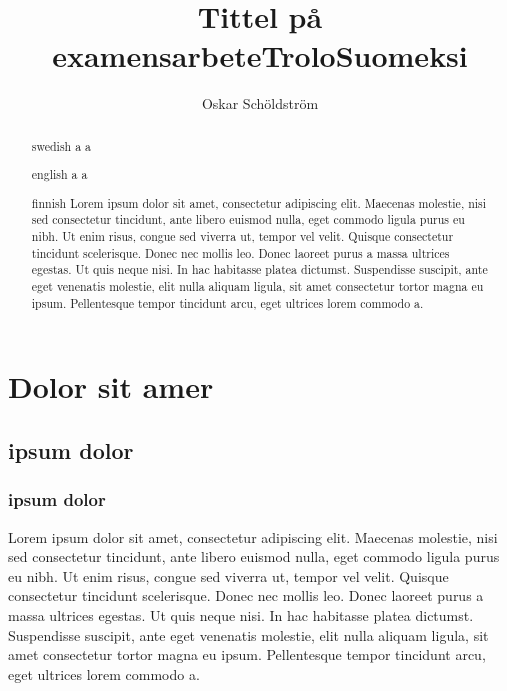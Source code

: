 \documentclass[twoside,emptyfirstpagenumber,swedish]{../thesis}
\begin{document}
\title{Tittel på examensarbete}
\author{Oskar Schöldström}
\date{\the\year}


\maketitle

\begin{abstract}{swedish}
a  a \\
\end{abstract}

\title{Trolo}
\begin{abstract}{english}
a  a \\
\end{abstract}

\title{Suomeksi}
\begin{abstract}{finnish}
Lorem ipsum dolor sit amet, consectetur adipiscing elit. Maecenas molestie, nisi sed consectetur tincidunt, ante libero euismod nulla, eget commodo ligula purus eu nibh. Ut enim risus, congue sed viverra ut, tempor vel velit. Quisque consectetur tincidunt scelerisque. Donec nec mollis leo. Donec laoreet purus a massa ultrices egestas. Ut quis neque nisi. In hac habitasse platea dictumst. Suspendisse suscipit, ante eget venenatis molestie, elit nulla aliquam ligula, sit amet consectetur tortor magna eu ipsum. Pellentesque tempor tincidunt arcu, eget ultrices lorem commodo a.
\end{abstract}

\maketoc

\listoftables

\listoffigures

\section{Dolor sit amer}

\subsection{ipsum dolor}

\subsubsection{ipsum dolor}
Lorem ipsum dolor sit amet, consectetur adipiscing elit. Maecenas molestie, nisi sed consectetur tincidunt, ante libero euismod nulla, eget commodo ligula purus eu nibh. Ut enim risus, congue sed viverra ut, tempor vel velit. Quisque consectetur tincidunt scelerisque. Donec nec mollis leo. Donec laoreet purus a massa ultrices egestas. Ut quis neque nisi. In hac habitasse platea dictumst. Suspendisse suscipit, ante eget venenatis molestie, elit nulla aliquam ligula, sit amet consectetur tortor magna eu ipsum. Pellentesque tempor tincidunt arcu, eget ultrices lorem commodo a.
\end{document}
